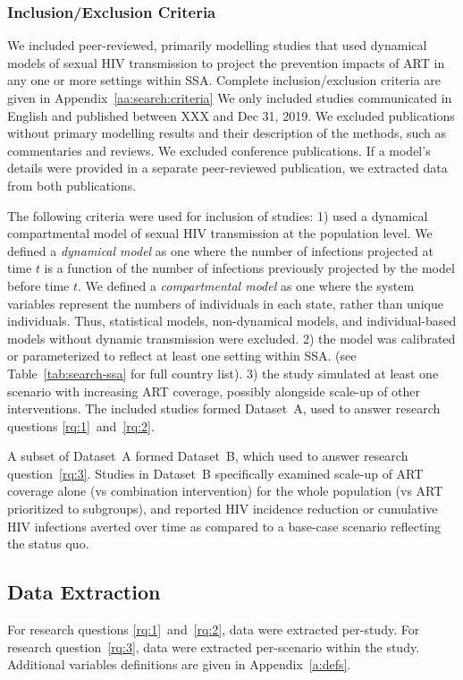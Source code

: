 \subsubsection{Inclusion/Exclusion Criteria}
\label{sss:meth:criteria}
We included peer-reviewed, primarily modelling studies that used dynamical models of sexual HIV transmission
to project the prevention impacts of ART in any one or more settings within SSA.
Complete inclusion/exclusion criteria are given in 
Appendix~\ref{aa:search:criteria}
We only included studies communicated in English and published between XXX and Dec 31, 2019.
We excluded publications without primary modelling results and their description of the methods,
such as commentaries and reviews. We excluded conference publications.
If a model's details were provided in a separate peer-reviewed publication, we extracted data from both publications. %
\par
The following criteria were used for inclusion of studies:
1) used a dynamical compartmental model of
sexual HIV transmission at the population level.
We defined a \emph{dynamical model} as one where
the number of infections projected at time $t$ is a function of
the number of infections previously projected by the model before time $t$. %
We defined a \emph{compartmental model} as one where
the system variables represent the numbers of individuals in each state,
rather than unique individuals. %
Thus, statistical models, non-dynamical models, and individual-based models without dynamic transmission were excluded.
2) the model was calibrated or parameterized to reflect at least one setting within SSA.
(see Table~\ref{tab:search-ssa} for full country list).
3) the study simulated at least one scenario with increasing ART coverage,
possibly alongside scale-up of other interventions.
The included studies formed Dataset~A,
used to answer research questions \ref{rq:1}~and~\ref{rq:2}.
\par
A subset of Dataset~A formed Dataset~B,
which used to answer research question~\ref{rq:3}.
Studies in Dataset~B specifically examined
scale-up of ART coverage alone (vs combination intervention)
for the whole population (vs ART prioritized to subgroups),
and reported HIV incidence reduction or cumulative HIV infections averted over time 
as compared to a base-case scenario reflecting the status quo.
\subsection{Data Extraction}
\label{ss:meth:data}
For research questions \ref{rq:1}~and~\ref{rq:2}, data were extracted per-study.
For research question~\ref{rq:3}, data were extracted per-scenario within the study.
Additional variables definitions are given in Appendix~\ref{a:defs}.
